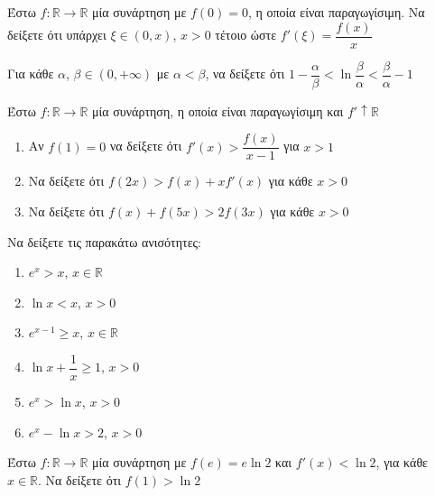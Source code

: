 \documentclass{presentation}
\begin{document}
\begin{askisi}
  Έστω $f:\mathbb{R}\to\mathbb{R}$ μία συνάρτηση με $f(0)=0$, η οποία είναι παραγωγίσιμη. Να δείξετε ότι υπάρχει $ξ\in (0,x)$, $x>0$ τέτοιο ώστε $f'(ξ)=\dfrac{f(x)}{x}$

\end{askisi}

\begin{askisi}
  Για κάθε $α$, $β\in (0,+\infty)$ με $α<β$, να δείξετε ότι $1-\dfrac{α}{β}<\ln \dfrac{β}{α}<\dfrac{β}{α}-1$

\end{askisi}

\begin{askisi}
  Έστω $f:\mathbb{R}\to\mathbb{R}$ μία συνάρτηση, η οποία είναι παραγωγίσιμη και $f'\uparrow \mathbb{R}$
  \begin{enumerate}
    \item<1-> Αν $f(1)=0$ να δείξετε ότι $f'(x)>\dfrac{f(x)}{x-1}$ για $x>1$
    \item<2-> Να δείξετε ότι $f(2x)>f(x)+xf'(x)$ για κάθε $x>0$
    \item<3-> Να δείξετε ότι $f(x)+f(5x)>2f(3x)$ για κάθε $x>0$
  \end{enumerate}

\end{askisi}

\begin{askisi}
  Να δείξετε τις παρακάτω ανισότητες:
  \begin{enumerate}
    \item<1-> $e^x> x$, $x\in\mathbb{R}$
    \item<2-> $\ln x<x$, $x>0$
    \item<3-> $e^{x-1}\ge x$, $x\in\mathbb{R}$
    \item<4-> $\ln x+\dfrac{1}{x}\ge 1$, $x>0$
    \item<5-> $e^x>\ln x$, $x>0$
    \item<6-> $e^x-\ln x>2$, $x>0$
  \end{enumerate}

\end{askisi}

\begin{askisi}
  Έστω $f:\mathbb{R}\to\mathbb{R}$ μία συνάρτηση με $f(e)=e\ln 2$ και $f'(x)<\ln 2$, για κάθε $x\in \mathbb{R}$. Να δείξετε ότι $f(1)>\ln 2$

\end{askisi}
\end{document}

